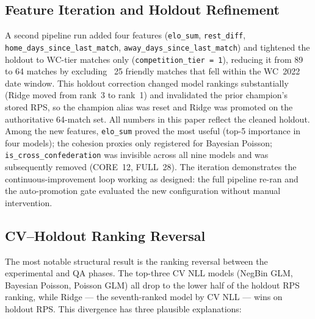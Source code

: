 \documentclass[conference]{IEEEtran}
\begin{document}
\subsection{Feature Iteration and Holdout Refinement}
\label{sec:gold_v2}

A second pipeline run added four features (\texttt{elo\_sum},
\texttt{rest\_diff}, \texttt{home\_days\_since\_last\_match},
\texttt{away\_days\_since\_last\_match}) and tightened the holdout to
WC-tier matches only (\texttt{competition\_tier~=~1}), reducing it from 89
to 64 matches by excluding ~25 friendly matches that fell within the
WC~2022 date window.  This holdout correction changed model rankings
substantially (Ridge moved from rank~3 to rank~1) and invalidated the
prior champion's stored RPS, so the champion alias was reset and Ridge was
promoted on the authoritative 64-match set.  All numbers in this paper
reflect the cleaned holdout.  Among the new features, \texttt{elo\_sum}
proved the most useful (top-5 importance in four models); the cohesion
proxies only registered for Bayesian Poisson; \texttt{is\_cross\_confederation}
was invisible across all nine models and was subsequently removed
(CORE~12, FULL~28).  The iteration demonstrates the continuous-improvement
loop working as designed: the full pipeline re-ran and the auto-promotion
gate evaluated the new configuration without manual intervention.

\subsection{CV--Holdout Ranking Reversal}

The most notable structural result is the ranking reversal between the
experimental and QA phases.  The top-three CV NLL models (NegBin GLM,
Bayesian Poisson, Poisson GLM) all drop to the lower half of the holdout
RPS ranking, while Ridge --- the seventh-ranked model by CV NLL --- wins
on holdout RPS.  This divergence has three plausible explanations:
\end{document}
